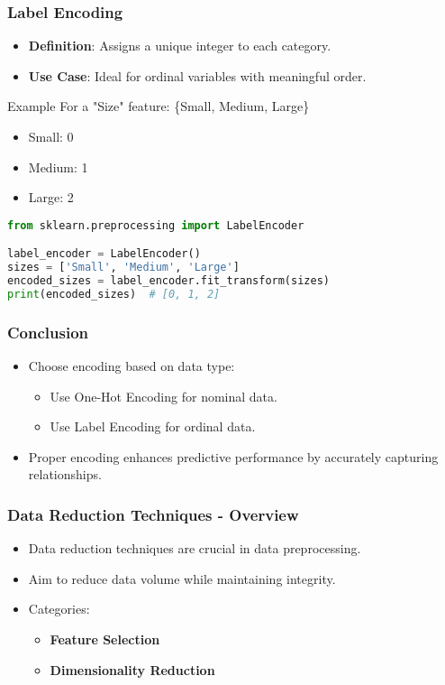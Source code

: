 \documentclass[aspectratio=169]{beamer}
\begin{document}
\begin{frame}[fragile]
    \frametitle{Label Encoding}
    \begin{itemize}
        \item \textbf{Definition}: Assigns a unique integer to each category.
        \item \textbf{Use Case}: Ideal for ordinal variables with meaningful order.
    \end{itemize}
    \begin{block}{Example}
        For a "Size" feature: \{Small, Medium, Large\}
        \begin{itemize}
            \item Small: 0
            \item Medium: 1
            \item Large: 2
        \end{itemize}
    \end{block}
    \begin{lstlisting}[language=Python]
from sklearn.preprocessing import LabelEncoder

label_encoder = LabelEncoder()
sizes = ['Small', 'Medium', 'Large']
encoded_sizes = label_encoder.fit_transform(sizes)
print(encoded_sizes)  # [0, 1, 2]
    \end{lstlisting}
\end{frame}

\begin{frame}[fragile]
    \frametitle{Conclusion}
    \begin{itemize}
        \item Choose encoding based on data type: 
        \begin{itemize}
            \item Use One-Hot Encoding for nominal data.
            \item Use Label Encoding for ordinal data.
        \end{itemize}
        \item Proper encoding enhances predictive performance by accurately capturing relationships.
    \end{itemize}
\end{frame}

\begin{frame}[fragile]
    \frametitle{Data Reduction Techniques - Overview}
    \begin{itemize}
        \item Data reduction techniques are crucial in data preprocessing.
        \item Aim to reduce data volume while maintaining integrity.
        \item Categories:
            \begin{itemize}
                \item \textbf{Feature Selection}
                \item \textbf{Dimensionality Reduction}
            \end{itemize}
    \end{itemize}
\end{frame}
\end{document}
